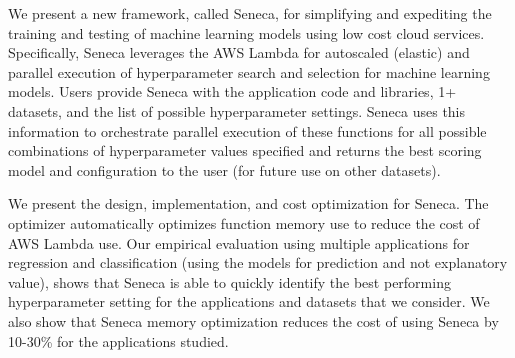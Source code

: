 
We present a new framework, called Seneca, for simplifying and expediting
the training and testing of machine learning models
using low cost cloud services.
Specifically, Seneca leverages the AWS Lambda for autoscaled
(elastic) and parallel execution of hyperparameter search 
and selection for machine learning models.  
Users provide Seneca with the application code and libraries, 1+ datasets, and the list 
of possible hyperparameter settings.  
Seneca uses this information to orchestrate parallel execution of these functions for all possible 
combinations of hyperparameter values specified and returns the best scoring model
and configuration to the user (for future use on other datasets).

We present the design, implementation, and cost optimization for Seneca.
The optimizer automatically optimizes function memory use to reduce the cost
of AWS Lambda use.  Our empirical evaluation using
multiple applications for regression and classification (using
the models for prediction and not explanatory value), shows that Seneca is able to quickly
identify the best performing hyperparameter setting for the applications and datasets that we consider.  
We also show that Seneca memory optimization reduces the cost of using
Seneca by 10-30\% for the applications studied.


